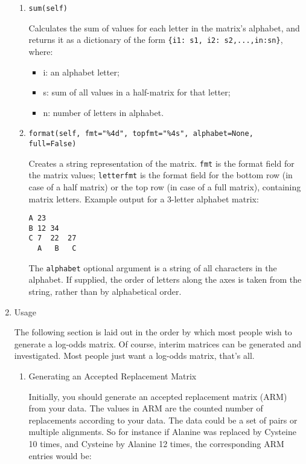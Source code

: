 \begin{enumerate}
\begin{enumerate}
    \item
\begin{verbatim}
sum(self)
\end{verbatim}
    Calculates the sum of values for each letter in the matrix's alphabet, and returns it as a dictionary of the form \verb|{i1: s1, i2: s2,...,in:sn}|, where:
    \begin{itemize}
      \item i: an alphabet letter;
      \item s: sum of all values in a half-matrix for that letter;
      \item n: number of letters in alphabet.
    \end{itemize}

    \item
\begin{verbatim}
format(self, fmt="%4d", topfmt="%4s", alphabet=None, full=False)
\end{verbatim}

    Creates a string representation of the matrix. \verb|fmt| is the format field for the matrix values; \verb|letterfmt| is the format field for the bottom row (in case of a half matrix) or the top row (in case of a full matrix), containing matrix letters. Example output for a 3-letter alphabet matrix:

\begin{verbatim}
A 23
B 12 34
C 7  22  27
  A   B   C
\end{verbatim}

    The \verb|alphabet| optional argument is a string of all characters in the alphabet. If supplied, the order of letters along the axes is taken from the string, rather than by alphabetical order.

  \end{enumerate}

\item Usage

   The following section is laid out in the order by which most people wish to generate a log-odds matrix. Of course, interim matrices can be generated and
   investigated. Most people just want a log-odds matrix, that's all.

   \begin{enumerate}

   \item Generating an Accepted Replacement Matrix

   Initially, you should generate an accepted replacement matrix (ARM) from your data. The values in ARM are the counted number of replacements according to your data. The data could be a set of pairs or multiple alignments. So for instance if Alanine was replaced by Cysteine 10 times, and Cysteine by Alanine 12 times, the corresponding ARM entries would be:


\end{enumerate}
\end{enumerate}
